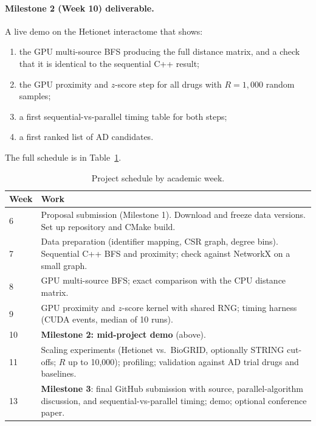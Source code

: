\paragraph{Milestone 2 (Week 10) deliverable.} A live demo on the Hetionet
interactome that shows:
\begin{enumerate}[nosep]
  \item the GPU multi-source BFS producing the full distance matrix, and a check that it is identical to the sequential C++ result;
  \item the GPU proximity and $z$-score step for all drugs with $R=1{,}000$ random samples;
  \item a first sequential-vs-parallel timing table for both steps;
  \item a first ranked list of AD candidates.
\end{enumerate}

The full schedule is in Table~\ref{tab:schedule}.

\begin{table}[h]
\centering
\small
\begin{tabularx}{\linewidth}{@{}lX@{}}
\toprule
Week & Work \\
\midrule
6 & Proposal submission (Milestone 1). Download and freeze data versions. Set up repository and CMake build. \\
7 & Data preparation (identifier mapping, CSR graph, degree bins). Sequential C++ BFS and proximity; check against NetworkX on a small graph. \\
8 & GPU multi-source BFS; exact comparison with the CPU distance matrix. \\
9 & GPU proximity and $z$-score kernel with shared RNG; timing harness (CUDA events, median of 10 runs). \\
10 & \textbf{Milestone 2: mid-project demo} (above). \\
11 & Scaling experiments (Hetionet vs.\ BioGRID, optionally STRING cut-offs; $R$ up to 10{,}000); profiling; validation against AD trial drugs and baselines. \\
13 & \textbf{Milestone 3}: final GitHub submission with source, parallel-algorithm discussion, and sequential-vs-parallel timing; demo; optional conference paper. \\
\bottomrule
\end{tabularx}
\caption{Project schedule by academic week.}
\label{tab:schedule}
\end{table}
